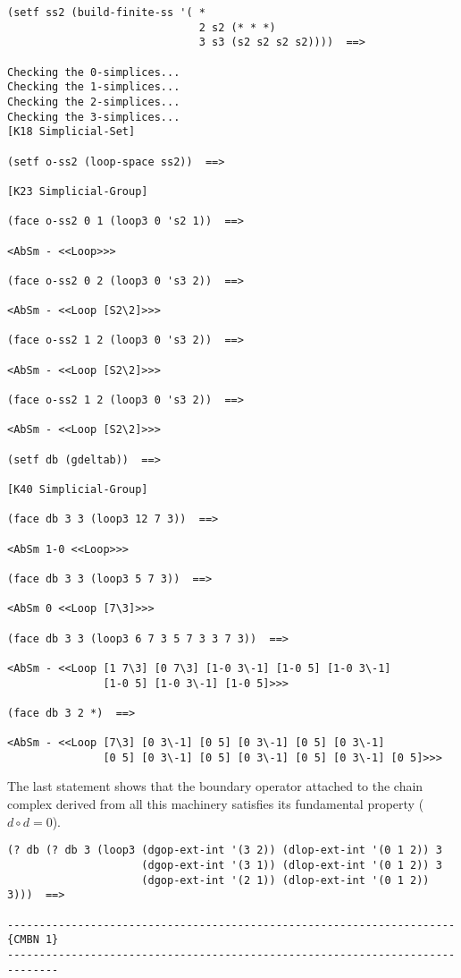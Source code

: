 {\footnotesize\begin{verbatim}
(setf ss2 (build-finite-ss '( *
                              2 s2 (* * *)
                              3 s3 (s2 s2 s2 s2))))  ==>

Checking the 0-simplices...
Checking the 1-simplices...
Checking the 2-simplices...
Checking the 3-simplices...
[K18 Simplicial-Set]

(setf o-ss2 (loop-space ss2))  ==>

[K23 Simplicial-Group]

(face o-ss2 0 1 (loop3 0 's2 1))  ==>

<AbSm - <<Loop>>>

(face o-ss2 0 2 (loop3 0 's3 2))  ==>

<AbSm - <<Loop [S2\2]>>>

(face o-ss2 1 2 (loop3 0 's3 2))  ==>

<AbSm - <<Loop [S2\2]>>>

(face o-ss2 1 2 (loop3 0 's3 2))  ==>

<AbSm - <<Loop [S2\2]>>>

(setf db (gdeltab))  ==>

[K40 Simplicial-Group]

(face db 3 3 (loop3 12 7 3))  ==>

<AbSm 1-0 <<Loop>>>

(face db 3 3 (loop3 5 7 3))  ==>

<AbSm 0 <<Loop [7\3]>>>

(face db 3 3 (loop3 6 7 3 5 7 3 3 7 3))  ==>

<AbSm - <<Loop [1 7\3] [0 7\3] [1-0 3\-1] [1-0 5] [1-0 3\-1]
               [1-0 5] [1-0 3\-1] [1-0 5]>>>

(face db 3 2 *)  ==>

<AbSm - <<Loop [7\3] [0 3\-1] [0 5] [0 3\-1] [0 5] [0 3\-1]
               [0 5] [0 3\-1] [0 5] [0 3\-1] [0 5] [0 3\-1] [0 5]>>>
\end{verbatim}}
The last  statement shows that the boundary operator attached to
the chain complex derived from all this machinery satisfies its fundamental
property ($d\circ d=0$).
{\footnotesize\begin{verbatim}
(? db (? db 3 (loop3 (dgop-ext-int '(3 2)) (dlop-ext-int '(0 1 2)) 3
                     (dgop-ext-int '(3 1)) (dlop-ext-int '(0 1 2)) 3
                     (dgop-ext-int '(2 1)) (dlop-ext-int '(0 1 2)) 3)))  ==>

----------------------------------------------------------------------{CMBN 1}
------------------------------------------------------------------------------
\end{verbatim}}
